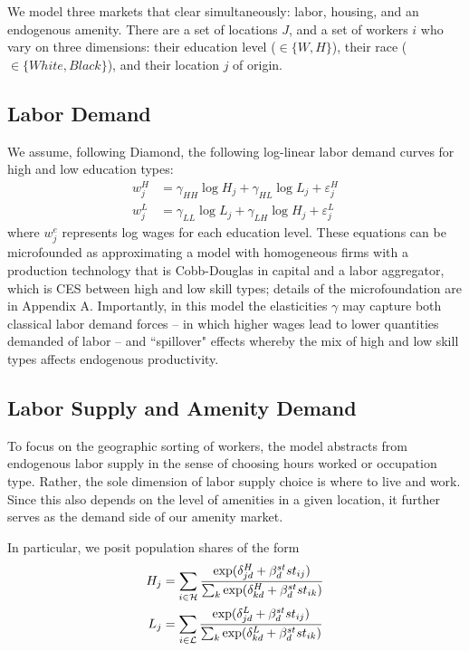\documentclass{article}
\begin{document}
We model three markets that clear simultaneously: labor, housing, and an endogenous amenity. There are a set of locations $J$, and a set of workers $i$ who vary on three dimensions: their education level ($\in \{W,H\}$), their race ($\in \{White,Black\}$), and their  location $j$ of origin. 


\subsection{Labor Demand}

We assume, following Diamond, the following log-linear labor demand curves for high and low education types: 
\begin{align}
    w_{j}^H &= \gamma_{HH}\log H_{j} + \gamma_{HL} \log L_{j} + \varepsilon_{j}^H \label{eq_wage_h_aprx} 
    \\ 
    w_{j}^L &= \gamma_{LL}\log L_{j} + \gamma_{LH} \log H_{j} + \varepsilon_{j}^L \label{eq_wage_l_aprx} 
\end{align}
 where $w_j^e$ represents log wages for each education level. These equations can be microfounded as approximating a model with homogeneous firms with a  production technology that is Cobb-Douglas in capital and a labor aggregator, which is CES between high and low skill types; details of the microfoundation are in Appendix A. Importantly, in this model the elasticities $\gamma$ may capture both classical labor demand forces  -- in which higher wages lead to lower quantities demanded of labor -- and ``spillover" effects whereby the mix of high and low skill types affects endogenous productivity. 

\subsection{Labor Supply and Amenity Demand }


To focus on the geographic sorting of workers, the model abstracts from endogenous labor supply in the sense of choosing hours worked or occupation type. Rather, the sole dimension of labor supply choice is where to live and work. Since this also depends on the level of amenities in a given location, it further serves as the demand side of our amenity market.

In particular, we posit population shares of the form 
\begin{align}\label{eq: population shares} 
H_{j} &= \sum_{i\in\mathcal{H}} \frac{\exp(\delta_{jd}^H + \beta_d^{st}st_{ij})}{\sum_{k} \exp(\delta_{kd}^H + \beta_d^{st}st_{ik})} \\
L_{j} &= \sum_{i\in\mathcal{L}} \frac{\exp(\delta_{jd}^L + \beta_d^{st}st_{ij})}{\sum_{k} \exp(\delta_{kd}^L + \beta_d^{st}st_{ik})}
\end{align}
\end{document}

